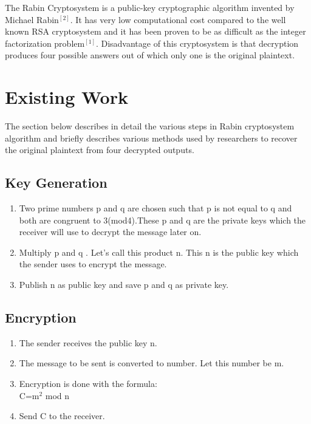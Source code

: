 \documentclass[letterpaper, 12 pt, conference]{ieeeconf}  %
\begin{document}
The Rabin Cryptosystem is a public-key cryptographic algorithm invented by Michael Rabin$^{[2]}$. It has very low computational cost compared to the well known RSA cryptosystem and it has been proven to be as difficult as the integer factorization problem$^{[1]}$. Disadvantage of this cryptosystem is that decryption produces four possible answers out of which only one is the original plaintext.




\section{Existing Work}
The section below describes in detail the various steps in Rabin cryptosystem algorithm and briefly describes various methods used by researchers to recover the original plaintext from four decrypted outputs.


\subsection{Key Generation}
\begin{enumerate}
  \item Two prime numbers p and q are chosen such that p is not equal to q and both  are congruent to 3(mod4).These p and q are the private keys which the receiver will use to decrypt the message later on.
  
  \item Multiply p and q . Let's call this product n. This n is the public key which the sender uses to encrypt the message.
  \item Publish n as public key and save p and q as private key.
\end{enumerate}




\subsection{Encryption}
\begin{enumerate}
  \item The sender receives the public key n.
  \item The message to be sent is converted to number. Let this number be m.
  \item Encryption is done with the formula:  \\C=m$^2$ mod n
    \item Send C to the receiver.
\end{enumerate}
 
\end{document}
